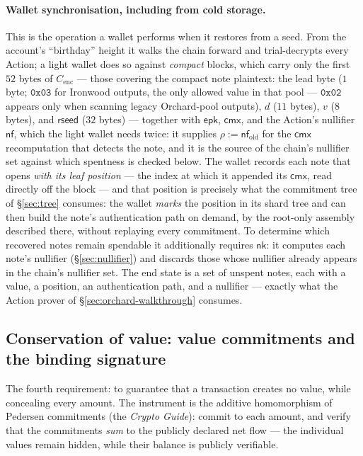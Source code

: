 \documentclass[11pt,a4paper]{article}
\theoremstyle{definition}
\newcommand{\nfsym}{\mathsf{nf}}
\newcommand{\cmx}{\mathsf{cmx}}
\newcommand{\nksym}{\ensuremath{\mathsf{nk}}}
\begin{document}
\paragraph{Wallet synchronisation, including from cold storage.} This is the
operation a wallet performs when it restores from a seed. From the account's
``birthday'' height it walks the chain forward and trial-decrypts every Action;
a light wallet does so against \emph{compact} blocks, which carry only the
first $52$ bytes of $C_{\mathrm{enc}}$ --- those covering the compact note
plaintext: the lead byte ($1$ byte; $\mathtt{0x03}$ for Ironwood outputs,
the only allowed value in that pool --- $\mathtt{0x02}$ appears only when
scanning legacy Orchard-pool outputs), $d$ ($11$ bytes), $v$
($8$ bytes), and $\mathsf{rseed}$ ($32$ bytes) --- together with
$\mathsf{epk}$, $\cmx$, and the Action's nullifier $\nfsym$, which the
light wallet needs twice: it supplies $\rho := \nfsym_{\mathrm{old}}$ for
the $\cmx$ recomputation that detects the note, and it is the source of
the chain's nullifier set against which spentness is checked below. The
wallet records each note that opens \emph{with its leaf
position} --- the index at which it appended its $\cmx$, read directly off the
block --- and that position is precisely what the commitment tree of
\S\ref{sec:tree} consumes: the wallet \emph{marks} the position in its shard
tree and can then build the note's authentication path on demand, by the
root-only assembly described there, without replaying every commitment. To
determine which recovered notes remain spendable it additionally requires
$\nksym$: it computes each note's nullifier (\S\ref{sec:nullifier}) and discards
those whose nullifier already appears in the chain's nullifier set. The end
state is a set of unspent notes, each with a value, a position, an
authentication path, and a nullifier --- exactly what the Action prover of
\S\ref{sec:orchard-walkthrough} consumes.

\subsection{Conservation of value: value commitments and the binding signature}\label{sec:value}

The fourth requirement: to guarantee that a transaction creates no value, while
concealing every amount. The instrument is the additive homomorphism of
Pedersen commitments (the \emph{Crypto Guide}): commit to each amount, and
verify that the commitments \emph{sum} to the publicly declared net flow --- the
individual values remain hidden, while their balance is publicly verifiable.
\end{document}
